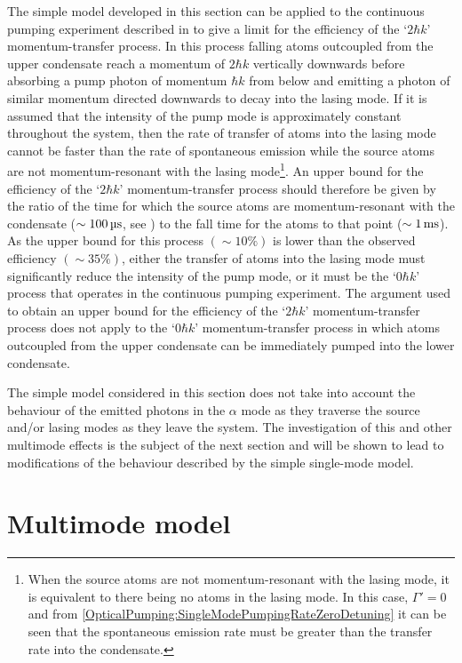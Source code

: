 The simple model developed in this section can be applied to the continuous pumping experiment described in  to give a limit for the efficiency of the `$2 \hbar k$' momentum-transfer process.  In this process falling atoms outcoupled from the upper condensate reach a momentum of $2\hbar k$ vertically downwards before absorbing a pump photon of momentum $\hbar k$ from below and emitting a photon of similar momentum directed downwards to decay into the lasing mode.  If it is assumed that the intensity of the pump mode is approximately constant throughout the system, then the rate of transfer of atoms into the lasing mode cannot be faster than the rate of spontaneous emission while the source atoms are not momentum-resonant with the lasing mode\footnote{When the source atoms are not momentum-resonant with the lasing mode, it is equivalent to there being no atoms in the lasing mode.  In this case, $\Gamma'=0$ and from \eqref{OpticalPumping:SingleModePumpingRateZeroDetuning} it can be seen that the spontaneous emission rate must be greater than the transfer rate into the condensate.}.  An upper bound for the efficiency of the `$2 \hbar k$' momentum-transfer process should therefore be given by the ratio of the time for which the source atoms are momentum-resonant with the condensate ($\sim\unit[100]{\micro s}$, see ) to the fall time for the atoms to that point ($\sim\unit[1]{ms}$).  As the upper bound for this process $(\sim 10\%)$ is lower than the observed efficiency $(\sim 35\%)$, either the transfer of atoms into the lasing mode must significantly reduce the intensity of the pump mode, or it must be the `$0 \hbar k$' process that operates in the continuous pumping experiment.  The argument used to obtain an upper bound for the efficiency of the `$2 \hbar k$' momentum-transfer process does not apply to the `$0 \hbar k$' momentum-transfer process in which atoms outcoupled from the upper condensate can be immediately pumped into the lower condensate.

The simple model considered in this section does not take into account the behaviour of the emitted photons in the $\alpha$ mode as they traverse the source and/or lasing modes as they leave the system.  The investigation of this and other multimode effects is the subject of the next section and will be shown to lead to modifications of the behaviour described by the simple single-mode model.

\section{Multimode model}
\label{OpticalPumping:MultimodeModel}

